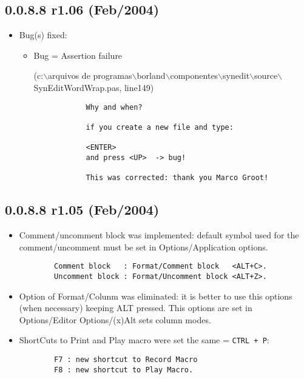 \subsection*{0.0.8.8 r1.06 (Feb/2004)}
\begin{itemize}
  \item Bug(s) fixed:
    \begin{itemize}
      \item Bug = Assertion failure\\
        \begin{footnotesize}
          (c:$\backslash$arquivos de programas$\backslash$borland$\backslash$componentes$\backslash$synedit$\backslash$source$\backslash$SynEditWordWrap.pas, line149)
        \end{footnotesize}

        \begin{footnotesize}
          \begin{verbatim}
            Why and when?

            if you create a new file and type:

            <ENTER>
            and press <UP>  -> bug!

            This was corrected: thank you Marco Groot!
          \end{verbatim}
        \end{footnotesize}

    \end{itemize}
\end{itemize}


\subsection*{0.0.8.8 r1.05 (Feb/2004)}
\begin{itemize}
  \item Comment/uncomment block was implemented: default symbol used for the
    comment/uncomment must be set in Options/Application options.

    \begin{footnotesize}
      \begin{verbatim}
        Comment block   : Format/Comment block   <ALT+C>.
        Uncomment block : Format/Uncomment block <ALT+Z>.
      \end{verbatim}
    \end{footnotesize}

  \item Option of Format/Colunm was eliminated: it is better to use this
    options (when necessary) keeping ALT pressed. This options are
    set in Options/Editor Options/(x)Alt sets column modes.
  \item ShortCuts to Print and Play macro were set the same = \texttt{CTRL + P}:

    \begin{footnotesize}
      \begin{verbatim}
        F7 : new shortcut to Record Macro
        F8 : new shortcut to Play Macro.
      \end{verbatim}
    \end{footnotesize}

\end{itemize}
